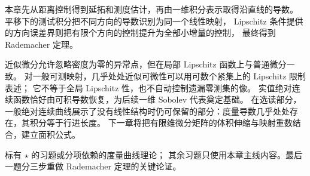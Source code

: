 




\begin{chaptersummary}
本章先从距离控制得到延拓和测度估计，再由一维积分表示取得沿直线的导数。
平移下的测试积分把不同方向的导数识别为同一个线性映射，
Lipschitz 条件提供的方向误差界则把有限个方向的控制提升为全部小增量的控制，
最终得到 Rademacher 定理。

\ProseParagraphBreak

近似微分允许忽略密度为零的异常点，但在局部 Lipschitz 函数上与普通微分一致。
对一般可测映射，几乎处处近似可微性可以用可数个紧集上的 Lipschitz 限制表述；
它不等于全局 Lipschitz 性，也不自动控制遗漏零测集的像。
实值绝对连续函数恰好由可积导数恢复，为后续一维 Sobolev 代表奠定基础。
在选读部分，一般绝对连续曲线展示了没有线性结构时仍可保留的部分：度量导数几乎处处存在，其积分等于行进长度。
下一章将把有限维微分矩阵的体积伸缩与映射重数结合，建立面积公式。
\end{chaptersummary}


\BookExercises


标有 \(\star\) 的习题或分项依赖的度量曲线理论；
其余习题只使用本章主线内容。最后一题分三步重做 Rademacher 定理的关键论证。


